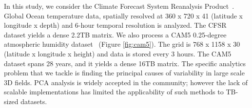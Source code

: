 In this study, we consider the Climate Forecast System Reanalysis Product~\cite{saha:2010}. Global Ocean temperature data, spatially resolved at 360 x 720 x 41 (latitude x longitude x depth) and 6-hour temporal resolution is analyzed. The CFSR dataset yields a dense 2.2TB matrix. We also process a CAM5 0.25-degree atmospheric humidity dataset~\cite{wehner:2014} (Figure  \ref{fig:cam5}). The grid is 768 x 1158 x 30 (latitude x longitude x height) and data is stored every 3 hours. The CAM5 dataset spans 28 years, and it yields a dense 16TB matrix. The specific analytics problem that we tackle is finding the principal causes of variability in large scale 3D fields. PCA analysis is widely accepted in the community; however the lack of scalable implementations has limited the applicability of such methods to TB-sized datasets.  
